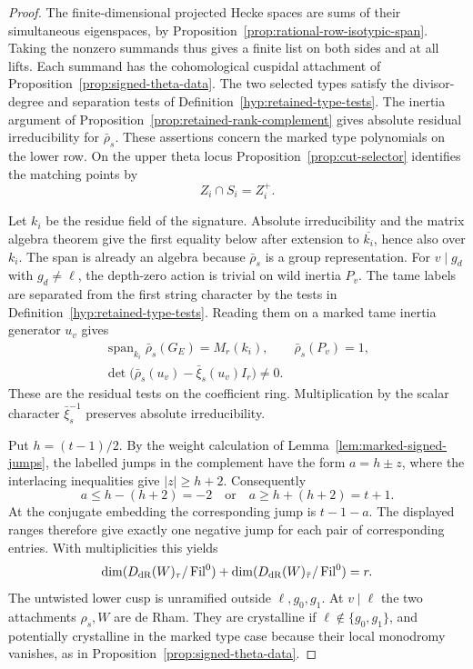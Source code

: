 \begin{proof}
The finite-dimensional projected Hecke spaces are sums of their
simultaneous eigenspaces, by Proposition~\ref{prop:rational-row-isotypic-span}.
Taking the nonzero summands thus gives a finite list on both sides and
at all lifts. Each summand has the cohomological cuspidal attachment
of Proposition~\ref{prop:signed-theta-data}. The two selected types
satisfy the divisor-degree and separation tests of
Definition~\ref{hyp:retained-type-tests}. The inertia argument of
Proposition~\ref{prop:retained-rank-complement} gives absolute
residual irreducibility for \(\bar\rho_s\). These assertions concern
the marked type polynomials on the lower row. On the upper theta
locus Proposition~\ref{prop:cut-selector} identifies the matching
points by
\[
                    Z_i\cap S_i=Z_i^+.
\]

Let \(k_i\) be the residue field of the signature. Absolute
irreducibility and the matrix algebra theorem give the first equality
below after extension to \(\overline{k_i}\), hence also over \(k_i\).
The span is already an algebra because \(\bar\rho_s\) is a
group representation. For \(v\mid g_d\) with \(g_d\ne\ell\), the
depth-zero action is trivial on wild inertia \(P_v\). The tame labels
are separated from the first string character by the tests in
Definition~\ref{hyp:retained-type-tests}. Reading them on a marked
tame inertia generator \(u_v\) gives
\[
 \begin{gathered}
 \operatorname{span}_{k_i}\bar\rho_s(G_E)=M_r(k_i),\qquad
 \bar\rho_s(P_v)=1,\\
 \det\bigl(\bar\rho_s(u_v)-\bar\xi_s(u_v)I_r\bigr)\ne0 .
 \end{gathered}
\]
These are the residual tests on the coefficient ring. Multiplication
by the scalar character \(\bar\xi_s^{-1}\) preserves absolute
irreducibility.

Put \(h=(t-1)/2\). By the weight calculation of
Lemma~\ref{lem:marked-signed-jumps}, the labelled jumps in the
complement have the form \(a=h\pm z\), where the interlacing
inequalities give \(|z|\ge h+2\). Consequently
\[
 a\le h-(h+2)=-2\quad\text{or}\quad
 a\ge h+(h+2)=t+1.
\]
At the conjugate embedding the corresponding jump is \(t-1-a\).
The displayed ranges therefore give exactly one negative jump for
each pair of corresponding entries. With multiplicities this yields
\[
 \dim(D_{\rm dR}(W)_\tau/\operatorname{Fil}^{0})+
 \dim(D_{\rm dR}(W)_{\bar\tau}/\operatorname{Fil}^{0})=r.
\]
The untwisted lower cusp is unramified outside \(\ell,g_0,g_1\).
At \(v\mid\ell\) the two attachments \(\rho_s,W\) are de Rham.
They are crystalline if \(\ell\notin\{g_0,g_1\}\), and potentially
crystalline in the marked type case because their local monodromy
vanishes, as in Proposition~\ref{prop:signed-theta-data}.


\end{proof}
